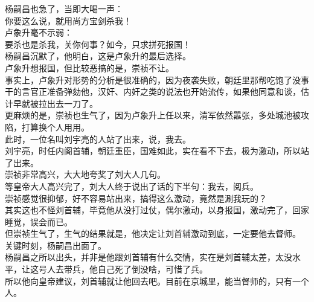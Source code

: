 \begin{multicols}{\theparacolNo}
杨嗣昌也急了，当即大喝一声：\\

你要这么说，就用尚方宝剑杀我！\\

卢象升毫不示弱：\\

要杀也是杀我，关你何事？如今，只求拼死报国！\\

杨嗣昌沉默了，他明白，这是卢象升的最后选择。\\

卢象升想报国，但比较恶搞的是，崇祯不让。\\

事实上，卢象升对形势的分析是很准确的，因为夜袭失败，朝廷里那帮吃饱了没事干的言官正准备弹劾他，汉奸、内奸之类的说法也开始流传，如果他同意和谈，估计早就被拉出去一刀了。\\

更麻烦的是，崇祯也生气了，因为卢象升上任以来，清军依然嚣张，多处城池被攻陷，打算换个人用用。\\

此时，一位名叫刘宇亮的人站了出来，说，我去。\\

刘宇亮，时任内阁首辅，朝廷重臣，国难如此，实在看不下去，极为激动，所以站了出来。\\

崇祯非常高兴，大大地夸奖了刘大人几句。\\

等皇帝大人高兴完了，刘大人终于说出了话的下半句：我去，阅兵。\\

崇祯感觉很抑郁，好不容易站出来，搞得这么激动，竟然是涮我玩的？\\

其实这也不怪刘首辅，毕竟他从没打过仗，偶尔激动，以身报国，激动完了，回家睡觉，误会而已。\\

但崇祯生气了，生气的结果就是，他决定让刘首辅激动到底，一定要他去督师。\\

关键时刻，杨嗣昌出面了。\\

杨嗣昌之所以出头，并非是他跟刘首辅有什么交情，实在是刘首辅太差，太没水平，让这号人去带兵，他自己死了倒没啥，可惜了兵。\\

所以他向皇帝建议，刘首辅就让他回去吧。目前在京城里，能当督师的，只有一个人。\\


\end{multicols}

